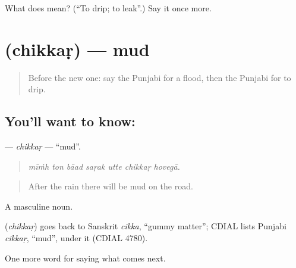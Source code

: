 \begin{tcolorbox}[breakable,colback=teal!4,colframe=teal!35!black,title={Before you move on}]
What does  mean? (\textquotedblleft{}To drip; to leak\textquotedblright{}.) Say it once more.
\end{tcolorbox}
\section[\texorpdfstring{\pa{ਚਿੱਕੜ} (chikkaṛ)}{ਚਿੱਕੜ (chikkaṛ)}]{ (chikkaṛ) — mud}

\label{lesson:PA-C287-chikkar}



\begin{quote}
Before the new one: say the Punjabi for a flood, then the Punjabi for to drip.
\end{quote}

\subsection*{You'll want to know: }
\textbf{} — \emph{chikkaṛ} — \textquotedblleft{}mud\textquotedblright{}.

\begin{quote}
      
\end{quote}

\begin{quote}
\emph{mīṁh ton bāad saṛak utte chikkaṛ hovegā.}
\end{quote}

\begin{quote}
After the rain there will be mud on the road.
\end{quote}

A masculine noun.

\begin{cousinweb}
\textbf{} (\emph{chikkaṛ}) goes back to Sanskrit \emph{cikka}, \textquotedblleft{}gummy matter\textquotedblright{}; CDIAL lists Punjabi \emph{cikkaṛ}, \textquotedblleft{}mud\textquotedblright{}, under it (CDIAL 4780).
\end{cousinweb}

\begin{grammarlens}[title={What you've built}]
One more word for saying what comes next.
\end{grammarlens}

